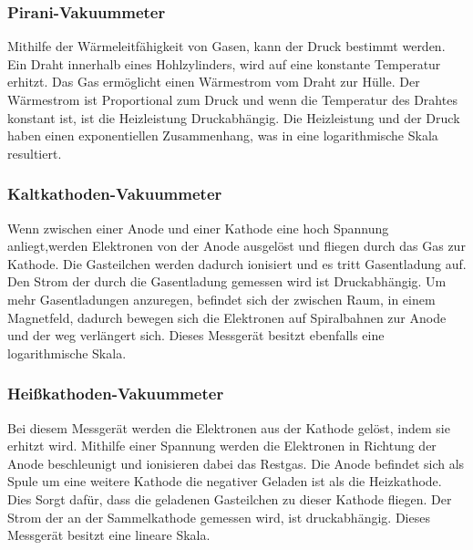 \subsubsection{Pirani-Vakuummeter}
Mithilfe der Wärmeleitfähigkeit von Gasen, kann der Druck bestimmt werden. Ein Draht innerhalb eines Hohlzylinders, wird auf eine konstante Temperatur erhitzt. Das Gas ermöglicht einen Wärmestrom vom Draht zur Hülle. Der Wärmestrom ist Proportional zum Druck und wenn die Temperatur des Drahtes konstant ist, ist die Heizleistung Druckabhängig. Die Heizleistung und der Druck haben einen exponentiellen Zusammenhang, was in eine logarithmische Skala resultiert\cite{Pfeifer13}.
\subsubsection{Kaltkathoden-Vakuummeter}
Wenn zwischen einer Anode und einer Kathode eine hoch Spannung anliegt,werden Elektronen von der Anode ausgelöst und fliegen durch das Gas zur Kathode. Die Gasteilchen werden dadurch ionisiert und es tritt Gasentladung auf. Den Strom der durch die Gasentladung gemessen wird ist Druckabhängig. 
Um mehr Gasentladungen anzuregen, befindet sich der zwischen Raum, in einem Magnetfeld, dadurch bewegen sich die Elektronen auf Spiralbahnen zur Anode und der weg verlängert sich.
Dieses Messgerät besitzt ebenfalls eine logarithmische Skala\cite{Pfeifer13}.
\subsubsection{Heißkathoden-Vakuummeter}
Bei diesem Messgerät werden die Elektronen aus der Kathode gelöst, indem sie erhitzt wird. Mithilfe einer Spannung werden die Elektronen in Richtung der Anode beschleunigt und ionisieren dabei das Restgas. Die Anode befindet sich als Spule um eine weitere Kathode die negativer Geladen ist als die Heizkathode. Dies Sorgt dafür, dass die geladenen Gasteilchen zu dieser Kathode fliegen. Der Strom der an der Sammelkathode gemessen wird, ist druckabhängig. Dieses Messgerät besitzt eine lineare Skala\cite{Pfeifer13}.